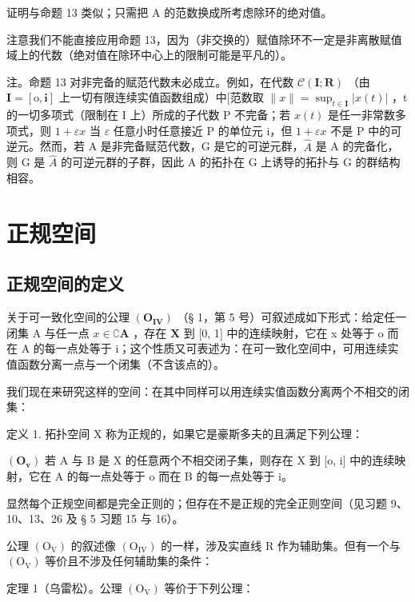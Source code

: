 证明与命题 13 类似；只需把 A 的范数换成所考虑除环的绝对值。

注意我们不能直接应用命题 13，因为（非交换的）赋值除环不一定是非离散赋值域上的代数（绝对值在除环中心上的限制可能是平凡的）。

注。命题 13 对非完备的赋范代数未必成立。例如，在代数 \(\mathcal{C}(\mathbf{I};\mathbf{R})\) （由 \(\mathbf{I} = [\mathrm{o},\mathbf{i}]\) 上一切有限连续实值函数组成）中{[}范数取 \(\| x\| = \sup_{t\in \mathbf{I}}|x(t)|\) ，t 的一切多项式（限制在 I 上）所成的子代数 P 不完备；若 \(x(t)\) 是任一非常数多项式，则 \(1 + \varepsilon x\) 当 \(\varepsilon\) 任意小时任意接近 P 的单位元 i，但 \(1 + \varepsilon x\) 不是 P 中的可逆元。然而，若 A 是非完备赋范代数，G 是它的可逆元群，\(\hat{A}\) 是 A 的完备化，则 G 是 \(\hat{A}\) 的可逆元群的子群，因此 A 的拓扑在 G 上诱导的拓扑与 G 的群结构相容。

\section{正规空间}

\subsection{正规空间的定义}

关于可一致化空间的公理 \((\mathbf{O}_{\mathbf{IV}})\) （§ 1，第 5 号）可叙述成如下形式：给定任一闭集 A 与任一点 \(x \in \complement \mathbf{A}\) ，存在 \(\mathbf{X}\) 到 {[}0, 1{]} 中的连续映射，它在 x 处等于 o 而在 A 的每一点处等于 i；这个性质又可表述为：在可一致化空间中，可用连续实值函数分离一点与一个闭集（不含该点的）。

我们现在来研究这样的空间：在其中同样可以用连续实值函数分离两个不相交的闭集：

定义 1. 拓扑空间 X 称为正规的，如果它是豪斯多夫的且满足下列公理：

\((\mathbf{O}_{\mathbf{v}})\) 若 A 与 B 是 X 的任意两个不相交闭子集，则存在 X 到 {[}o, i{]} 中的连续映射，它在 A 的每一点处等于 o 而在 B 的每一点处等于 i。

显然每个正规空间都是完全正则的；但存在不是正规的完全正则空间（见习题 9、10、13、26 及 § 5 习题 15 与 16）。

公理 \((\mathrm{O}_{\mathrm{V}})\) 的叙述像 \((\mathrm{O}_{\mathrm{IV}})\) 的一样，涉及实直线 R 作为辅助集。但有一个与 \((\mathrm{O}_{\mathrm{V}})\) 等价且不涉及任何辅助集的条件：

定理 1（乌雷松）。公理 \((\mathrm{O}_{\mathrm{V}})\) 等价于下列公理：

